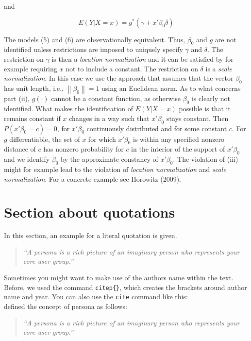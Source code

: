\documentclass[a4paper]{article}
\newcommand{\norm}[1]{\left\lVert#1\right\rVert}
\begin{document}
and

\begin{equation}
E(Y|X = x) = g^*(\gamma + x'\beta_0\delta)
\end{equation}

The models (5) and (6) are observationally equivalent. Thus, $\beta_0$ and $g$ are not identified unless restrictions are imposed to uniquely specify $\gamma$ and $\delta$. The restriction on $\gamma$ is then a \textit{location normalization} and it can be satisfied by for example requiring $x$ not to include a constant. The restriction on $\delta$ is a \textit{scale normalization}. In this case we use the approach that assumes that the vector $\beta_0$ has unit length, i.e., $\norm{ \beta_0 } = 1$ using an Euclidean norm.
As to what concerns part (ii), $g(\cdot)$ cannot be a constant function, as otherwise $\beta_0$ is clearly not identified. What makes the identification of $E(Y|X = x)$ possible is that it remains constant if $x$ changes in a way such that $x'\beta_0$ stays constant. Then $P(x'\beta_0 = c)=0$, for $x'\beta_0$ continuously distributed and for some constant $c$. For $g$ differentiable, the set of $x$ for which $x'\beta_0$ is within any specified nonzero distance of $c$ has nonzero probability for $c$ in the interior of the support of $x'\beta_0$ and we identify $\beta_0$ by the approximate constancy of $x'\beta_0$.
The violation of (iii) might for example lead to the violation of \textit{location normalization} and \textit{scale normalization}. For a concrete example see Horowitz (2009).

\section{Section about quotations} %
\label{sec:section_about_quotations}

In this section, an example for a literal quotation is given. 

\begin{quotation}
	\emph{``A persona is a rich picture of an imaginary person who represents your core user group.''}
	\citep{Dix04}
\end{quotation}

Sometimes you might want to make use of the authors name within the text. Before, we used the command \texttt{citep\{\}}, which creates the brackets around author name and year. You can also use the \texttt{cite} command like this: \\

\cite{Dix04} defined the concept of persona as follows: 
\begin{quotation}
	\emph{``A persona is a rich picture of an imaginary person who represents your core user group.''}
	\citep{Dix04}
\end{quotation}
\end{document}
